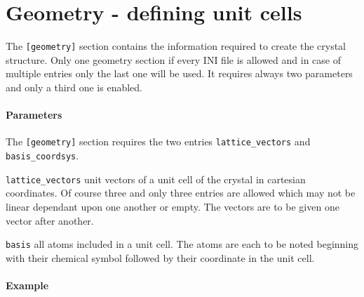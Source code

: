 \section{Geometry - defining unit cells} 
The \lstinline{[geometry]} section contains the information required to create the crystal structure. Only one geometry section if every INI file is allowed and in case of multiple entries only the last one will be used. It requires always two parameters and only a third one is enabled.

\paragraph{Parameters}
The \lstinline{[geometry]} section requires the two entries \lstinline{lattice_vectors} and \lstinline{basis_coordsys}.
\begin{description}
 \item{\lstinline{lattice_vectors}} unit vectors of a unit cell of the crystal in cartesian coordinates. Of course three and only three entries are allowed which may not be linear dependant upon one another or empty. The vectors are to be given one vector after another.
 \item{\lstinline{basis}} all atoms included in a unit cell. The atoms are each to be noted beginning with their chemical symbol followed by their coordinate in the unit cell.
\end{description}

\paragraph{Example}


